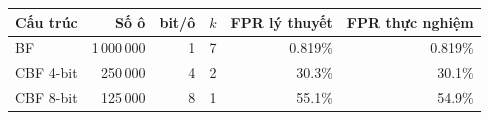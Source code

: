 \begin{tabular}{@{}lrrrrr@{}}
\toprule
Cấu trúc & Số ô & bit/ô & $k$ & FPR lý thuyết & FPR thực nghiệm\\
\midrule
BF & 1\,000\,000 & 1 & 7 & 0.819\% & 0.819\%\\
CBF 4-bit & 250\,000 & 4 & 2 & 30.3\% & 30.1\%\\
CBF 8-bit & 125\,000 & 8 & 1 & 55.1\% & 54.9\%\\
\bottomrule
\end{tabular}
